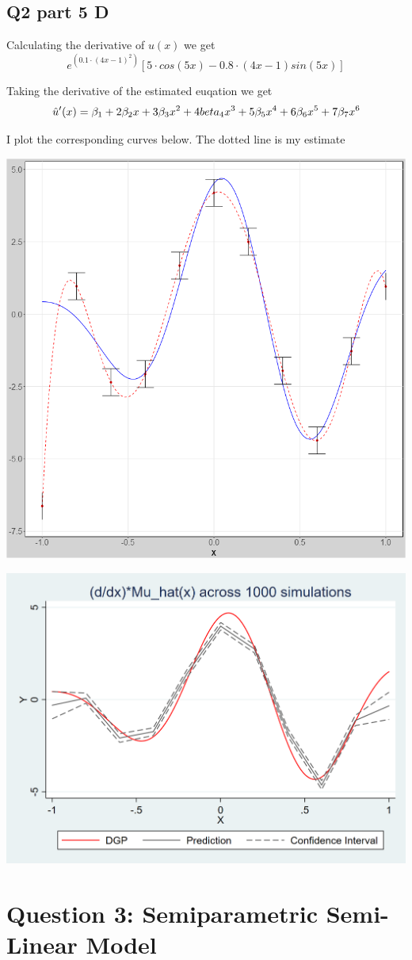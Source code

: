 \documentclass[11pt]{article}
\begin{document}
\subsection{Q2 part 5 D}
Calculating the derivative of $u(x)$ we get 
$$ e^{(0.1\cdot(4x-1)^2)}[5 \cdot cos(5x) - 0.8 \cdot (4x-1)sin(5x)]
$$

Taking the derivative of the estimated euqation we get 
$$\hat{u}'(x) = \beta_1 + 2\beta_2x + 3\beta_3x^2 + 4\\beta_4x^3 + 5\beta_5x^4 + 6\beta_6x^5 + 7\beta_7x^6$$

I plot the corresponding curves below. The dotted line is my estimate 
\begin{center}
	\includegraphics[width=.6\linewidth]{plot_2_5_d.png}
	
\end{center}

\begin{center}
	\includegraphics[width=.6\linewidth]{stata_plot_2_5_d.png}
	
\end{center}


\section{Question 3: Semiparametric Semi-Linear Model }
\end{document}
